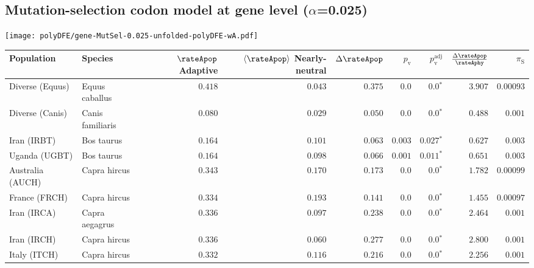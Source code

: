 \subsection{Mutation-selection codon model at gene level ($\alpha$=0.025)}
\begin{center}
    \texttt{[image: polyDFE/gene-MutSel-0.025-unfolded-polyDFE-wA.pdf]}
    \begin{adjustbox}{width = 1\textwidth}
        \begin{tabular}{|l|l|r|r|r|r|r|r|r|}
            \toprule
            Population & Species & \specialcell{$\rateApop$ \\ Adaptive}                & \specialcell{$\left< \rateApop \right>$ \\ Nearly-neutral}                & $\Delta \rateApop $    & $p_{\mathrm{v}}$ & $p_{\mathrm{v}}^{\mathrm{adj}}$ & $\frac{\Delta\rateApop}{\rateAphy}$ & $\pi_{\textrm{S}}$    \\
            \midrule
            Diverse (Equus)                    & Equus caballus          & $ 0.418$ & $ 0.043$ & $ 0.375$ & $0.0$ & $\bm{0.0{^*}}$ & $ 3.907$ & $0.00093$ \\
            Diverse (Canis)                  & Canis familiaris          & $ 0.080$ & $ 0.029$ & $ 0.050$ & $0.0$ & $\bm{0.0{^*}}$ & $ 0.488$ & $ 0.001$ \\
            Iran (IRBT)               & Bos taurus        & $ 0.164$ & $ 0.101$ & $ 0.063$ & $ 0.003$    & $\bm{ 0.027{^*}}$    & $ 0.627$ & $ 0.003$ \\
            Uganda (UGBT)                  & Bos taurus        & $ 0.164$ & $ 0.098$ & $ 0.066$ & $ 0.001$    & $\bm{ 0.011{^*}}$    & $ 0.651$ & $ 0.003$ \\
            Australia (AUCH)                    & Capra hircus      & $ 0.343$ & $ 0.170$ & $ 0.173$ & $0.0$    & $\bm{0.0{^*}}$    & $ 1.782$ & $0.00099$ \\
            France (FRCH)                    & Capra hircus        & $ 0.334$ & $ 0.193$ & $ 0.141$ & $0.0$    & $\bm{0.0{^*}}$    & $ 1.455$ & $0.00097$ \\
            Iran (IRCA)                   & Capra aegagrus        & $ 0.336$ & $ 0.097$ & $ 0.238$ & $0.0$    & $\bm{0.0{^*}}$    & $ 2.464$ & $ 0.001$ \\
            Iran (IRCH)                 & Capra hircus        & $ 0.336$ & $ 0.060$ & $ 0.277$ & $0.0$    & $\bm{0.0{^*}}$    & $ 2.800$ & $ 0.001$ \\
            Italy (ITCH)                    & Capra hircus          & $ 0.332$ & $ 0.116$ & $ 0.216$ & $0.0$    & $\bm{0.0{^*}}$    & $ 2.256$ & $ 0.001$  \\

\end{tabular}
\end{adjustbox}
\end{center}
